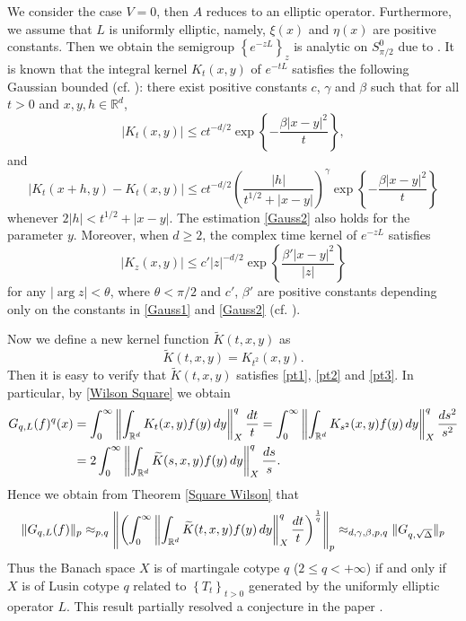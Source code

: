 \documentclass[oneside,english,a4wide]{amsart}
\numberwithin{equation}{section}
\numberwithin{figure}{section}
\theoremstyle{plain}
\theoremstyle{plain}
\theoremstyle{definition}
\theoremstyle{plain}
\theoremstyle{remark}
\theoremstyle{definition}
\theoremstyle{remark}
\theoremstyle{definition}
\newcommand{\real}{{\mathbb R}}
\newcommand{\8}{+\infty}
\renewcommand{\1}{\mathbbm{1}}
\newcommand{\wt}{\widetilde}
\newcommand\norm[1]{ \left\| #1 \right\| }
\newcommand\sk[1]{ \left( #1 \right) }
\newcommand\lk[1]{ \left\{ #1 \right\} }
\renewcommand\d{{\rm d}}
\begin{document}
{We consider the case $V=0$, then $A$ reduces to an elliptic operator. Furthermore, we assume that $L$ is uniformly elliptic, namely, $\xi(x)$ and $\eta(x)$ are positive constants. Then we obtain the semigroup $\lk{ e^{-zL} }_{z}$ is analytic on $S^0_{\pi/2}$ due to \cite{Auscher1998}. It is known that the integral kernel $K_t(x, y)$ of $e^{-t L}$ satisfies the following Gaussian bounded (cf. \cite[Chapter 1, Theorem 4]{Auscher1998}): there exist positive constants $c$, $\gamma$ and $\beta$ such that for all $t > 0$ and $x, y, h \in \real^d$,
\begin{equation}\label{Gauss1}
    |K_t(x, y)| \leq ct^{-d/2}\exp\lk{ -\frac{\beta
    |x- y|^2}{t} },
\end{equation}
and
\begin{equation}\label{Gauss2}
    |K_t(x + h, y) - K_t(x, y)| \leq ct^{-d/2}\sk{ \frac{|h|}{t^{1/2} + |x - y| } }^\gamma \exp\lk{ -\frac{\beta
    |x- y|^2}{t} }
\end{equation}
whenever $2|h| < t^{1/2} + |x - y|$. The estimation \eqref{Gauss2} also holds for the parameter $y$. Moreover, when $d \geq 2$, the complex time kernel of $e^{-zL}$ satisfies
\begin{equation}
    |K_z(x, y)| \leq c'|z|^{-d/2}\exp\lk{ \frac{\beta'|x - y|^2}{|z|} }
\end{equation}
for any $|\arg z| < \theta$, where $\theta < \pi/2$ and $c'$, $\beta'$ are positive constants depending only on the constants in \eqref{Gauss1} and \eqref{Gauss2} (cf. \cite[Chapter 1, Lemma 19]{Auscher1998}).

Now we define a new kernel function $\wt{K}(t, x, y)$ as
\[
    \wt{K}(t, x, y) = K_{t^2}(x, y).
\]
Then it is easy to verify that $\wt{K}(t, x, y)$ satisfies \eqref{pt1}, \eqref{pt2} and \eqref{pt3}. In particular, by \eqref{Wilson Square} we obtain
\[
\begin{aligned}
    G_{q, L}(f)^q(x) & = \int_0^{\infty} \norm{ \int_{\real^d} K_t(x, y)f(y) \,\d y }_X^q \frac{\d t}{t} = \int_0^{\infty} \norm{ \int_{\real^d} K_{s^2}(x, y)f(y) \,\d y }_X^q \frac{\d s^2}{s^2} \\
    & = 2\int_0^{\infty} \norm{ \int_{\real^d} \wt{K}(s, x, y)f(y) \,\d y }_X^q \frac{\d s}{s}.
\end{aligned}
\]
Hence we obtain from Theorem \ref{Square Wilson} that
\[
    \| G_{q, L}(f) \|_p \approx_{p, q} \norm{ \sk{ \int_0^{\infty} \norm{ \int_{\real^d} \wt{K}(t, x, y)f(y) \,\d y }_X^q \frac{\d t}{t} }^{\frac{1}{q}} }_p \approx_{d, \gamma, \beta, p, q} \| G_{q, \sqrt{\Delta}} \|_p
\]
Thus the Banach space $X$ is of martingale cotype $q$ ($2 \leq q < + \infty$) if and only if $X$ is of Lusin cotype $q$ related to $\lk{T_t}_{t > 0}$ generated by the uniformly elliptic operator $L$. This result partially resolved a conjecture in the paper \cite[Conjecture A.4]{Xu2021}. 

}
\end{document}
